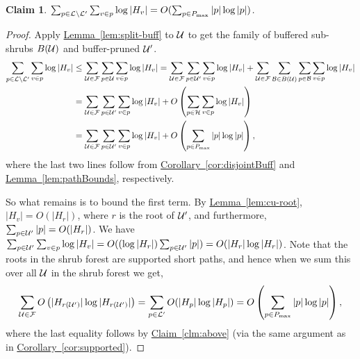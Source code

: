\documentclass[11pt]{article}
\newtheorem{claim}[theorem]{Claim}
\theoremstyle{definition}
\newcommand{\cF}{{\cal F}}
\newcommand{\cH}{{\cal H}}
\newcommand{\cL}{{\cal L}}
\newcommand{\cU}{{\cal U}}
\newcommand{\Clm}[1]{\hyperref[clm:#1]{Claim~\ref*{clm:#1}}} %
\newcommand{\Lem}[1]{\hyperref[lem:#1]{Lemma~\ref*{lem:#1}}} %
\newcommand{\Cor}[1]{\hyperref[cor:#1]{Corollary~\ref*{cor:#1}}} %
\newcommand{\pmax}{P_{\max}}
\begin{document}

\begin{claim} \label{clm:first} 
$\sum_{p \in \cL \setminus \cL'} \sum_{v \in p} \log |H_v| = O(\sum_{p\in \pmax} |p|\log |p|)$.%
\end{claim}

\begin{proof} Apply \Lem{split-buff} to $\cU$ to get the family of buffered
sub-shrubs $B(\cU)$ and buffer-pruned $\pruned$.
\begin{align*}
 \sum_{p \in \cL \setminus \cL'} \sum_{v \in p} \log |H_v| 
 &\leq \sum_{\cU\in \cF} \sum_{p \in \cU} \sum_{v \in p} \log |H_v|
 = \sum_{\cU\in \cF}\sum_{p \in \pruned} \sum_{v \in p} \log |H_v|  +  \sum_{\cU\in \cF}\sum_{\buff\in B(\cU)} \sum_{p \in \buff} \sum_{v \in p} \log |H_v|\\
 &= \sum_{\cU\in \cF}\sum_{p \in \pruned} \sum_{v \in p} \log |H_v|  +  O\left(\sum_{p\in \cH}\sum_{v\in p} \log |H_v| \right)\\
 &= \sum_{\cU\in \cF}\sum_{p \in \pruned} \sum_{v \in p} \log |H_v|  +  O\left(\sum_{p\in \pmax} |p|\log |p|\right),
\end{align*}
where the last two lines follow from \Cor{disjointBuff} and \Lem{pathBounds}, respectively. 

So what remains is to bound the first term.  
By \Lem{cu-root}, $|H_v| = O(|H_r|)$, where $r$ is the root of $\pruned$, and furthermore, $\sum_{p \in \pruned} |p| = O(|H_r|)$. 
We have $\sum_{p \in \pruned} \sum_{v \in p} \log |H_v| = O((\log |H_r|) \sum_{p \in \pruned} |p|) = O(|H_r|\log |H_r|)$.
Note that the roots in the shrub forest are supported short paths, and hence when we sum this over all $\cU$ in the shrub forest we get, 
\[
\sum_{\cU\in \cF} O\left(|H_{r(\pruned)}|\log |H_{r(\pruned)}|\right)
=\sum_{p\in \cL'} O(|H_p|\log |H_p|) = O\left(\sum_{p\in \pmax} |p|\log |p|\right),
\]
where the last equality follows by \Clm{above} (via the same argument as in \Cor{supported}).
\end{proof}
\end{document}

